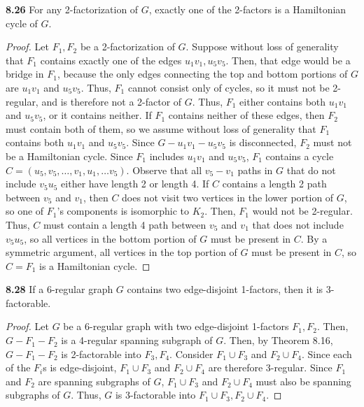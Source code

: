 \documentclass[12pt]{article}
\begin{document}
\newpage\noindent\textbf{8.26} For any 2-factorization of $G$, exactly one of the 2-factors is a Hamiltonian cycle of $G$.
\begin{proof}
    Let $F_1, F_2$ be a 2-factorization of $G$.
    Suppose without loss of generality that $F_1$ contains exactly one of the edges $u_1v_1, u_5v_5$.
    Then, that edge would be a bridge in $F_1$, because the only edges connecting the top and bottom portions of $G$ are $u_1v_1$ and $u_5v_5$.
    Thus, $F_1$ cannot consist only of cycles, so it must not be 2-regular, and is therefore not a 2-factor of $G$.
    Thus, $F_1$ either contains both $u_1v_1$ and $u_5v_5$, or it contains neither.
    If $F_1$ contains neither of these edges, then $F_2$ must contain both of them, so we assume without loss of generality that $F_1$ contains both $u_1v_1$ and $u_5v_5$.
    Since $G-u_1v_1 - u_5v_5$ is disconnected, $F_2$ must not be a Hamiltonian cycle.
    Since $F_1$ includes $u_1v_1$ and $u_5v_5$, $F_1$ contains a cycle $C = (u_5,v_5, \hdots, v_1, u_1, \hdots v_5)$.
    Observe that all $v_5-v_1$ paths in $G$ that do not include $v_5u_5$ either have length 2 or length 4.
    If $C$ contains a length 2 path between $v_5$ and $v_1$, then $C$ does not visit two vertices in the lower portion of $G$, so one of $F_1$'s components is isomorphic to $K_2$.
    Then, $F_1$ would not be 2-regular.
    Thus, $C$ must contain a length 4 path between $v_5$ and $v_1$ that does not include $v_5u_5$, so all vertices in the bottom portion of $G$ must be present in $C$.
    By a symmetric argument, all vertices in the top portion of $G$ must be present in $C$, so $C = F_1$ is a Hamiltonian cycle.
\end{proof}


\newpage\noindent\textbf{8.28} If a 6-regular graph $G$ contains two edge-disjoint 1-factors, then it is 3-factorable.
\begin{proof}
    Let $G$ be a 6-regular graph with two edge-disjoint 1-factors $F_1, F_2$.
    Then, $G - F_1 - F_2$ is a 4-regular spanning subgraph of $G$.
    Then, by Theorem 8.16, $G-F_1 -F_2$ is 2-factorable into $F_3, F_4$.
    Consider $F_1 \cup F_3$ and $F_2 \cup F_4$.
    Since each of the $F_i$s is edge-disjoint, $F_1 \cup F_3$ and $F_2 \cup F_4$ are therefore 3-regular.
    Since $F_1$ and $F_2$ are spanning subgraphs of $G$, $F_1 \cup F_3$ and $F_2 \cup F_4$ must also be spanning subgraphs of $G$.
    Thus, $G$ is 3-factorable into $F_1 \cup F_3, F_2 \cup F_4$.
\end{proof}
\end{document}
